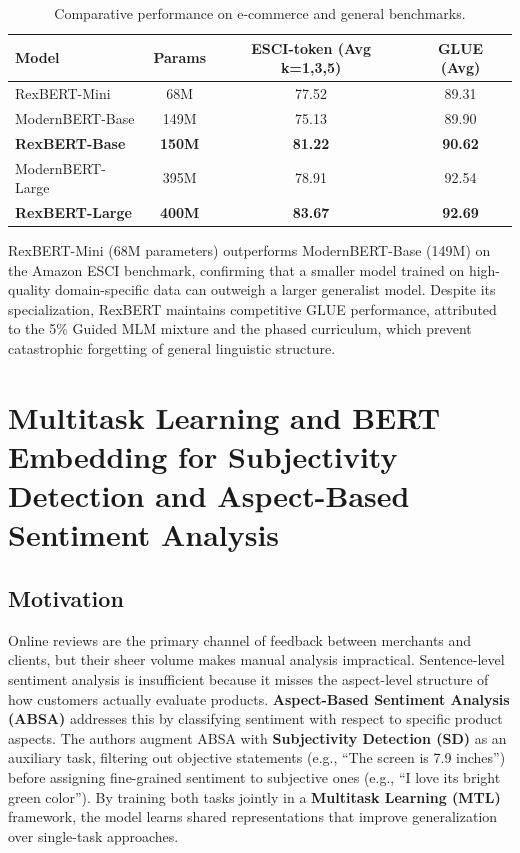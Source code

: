 \documentclass[a4paper,12pt]{article}
\begin{document}
\begin{table}[h]
\centering
\caption{Comparative performance on e-commerce and general benchmarks.}
\label{tab:rexbert_results}
\begin{tabular}{lccc}
\hline
\textbf{Model} & \textbf{Params} & \textbf{ESCI-token (Avg k=1,3,5)} & \textbf{GLUE (Avg)} \\ \hline
RexBERT-Mini & 68M & 77.52 & 89.31 \\
ModernBERT-Base & 149M & 75.13 & 89.90 \\
\textbf{RexBERT-Base} & \textbf{150M} & \textbf{81.22} & \textbf{90.62} \\
ModernBERT-Large & 395M & 78.91 & 92.54 \\
\textbf{RexBERT-Large} & \textbf{400M} & \textbf{83.67} & \textbf{92.69} \\ \hline
\end{tabular}
\end{table}

RexBERT-Mini (68M parameters) outperforms ModernBERT-Base (149M) on the Amazon ESCI benchmark, confirming that a smaller model trained on high-quality domain-specific data can outweigh a larger generalist model. Despite its specialization, RexBERT maintains competitive GLUE performance, attributed to the 5\% Guided MLM mixture and the phased curriculum, which prevent catastrophic forgetting of general linguistic structure.

\section{Multitask Learning and BERT Embedding for Subjectivity Detection and Aspect-Based Sentiment Analysis}

\subsection{Motivation}
Online reviews are the primary channel of feedback between merchants and clients, but their sheer volume makes manual analysis impractical. Sentence-level sentiment analysis is insufficient because it misses the aspect-level structure of how customers actually evaluate products. \textbf{Aspect-Based Sentiment Analysis (ABSA)} addresses this by classifying sentiment with respect to specific product aspects. The authors augment ABSA with \textbf{Subjectivity Detection (SD)} as an auxiliary task, filtering out objective statements (e.g., ``The screen is 7.9 inches'') before assigning fine-grained sentiment to subjective ones (e.g., ``I love its bright green color''). By training both tasks jointly in a \textbf{Multitask Learning (MTL)} framework, the model learns shared representations that improve generalization over single-task approaches.
\end{document}
